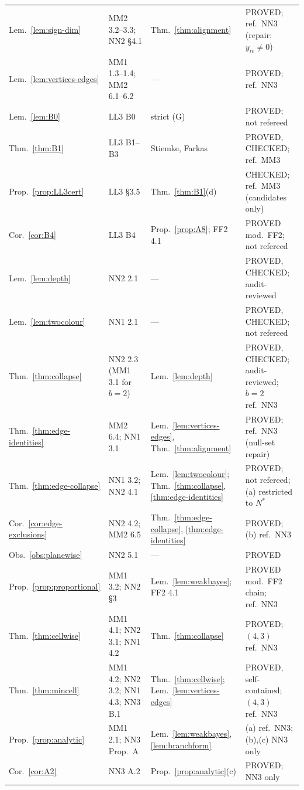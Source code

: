 \documentclass[11pt]{article}
\theoremstyle{definition}
\theoremstyle{remark}
\begin{document}
{\begin{longtable}{>{\raggedright}p{}>{\raggedright}p{}>{\raggedright}p{}>{\raggedright\arraybackslash}p{}}
Lem.~\ref{lem:sign-dim} & MM2 3.2--3.3; NN2 \S4.1 & Thm.~\ref{thm:alignment} & PROVED; ref.\ NN3 (repair: $y_{iv}\ne0$) \\
Lem.~\ref{lem:vertices-edges} & MM1 1.3--1.4; MM2 6.1--6.2 & --- & PROVED; ref.\ NN3 \\
Lem.~\ref{lem:B0} & LL3 B0 & strict (G) & PROVED; not refereed \\
Thm.~\ref{thm:B1} & LL3 B1--B3 & Stiemke, Farkas & PROVED, CHECKED; ref.\ MM3 \\
Prop.~\ref{prop:LL3cert} & LL3 \S3.5 & Thm.~\ref{thm:B1}(d) & CHECKED; ref.\ MM3 (candidates only) \\
Cor.~\ref{cor:B4} & LL3 B4 & Prop.~\ref{prop:A8}; FF2 4.1 & PROVED mod.\ FF2; not refereed \\
Lem.~\ref{lem:depth} & NN2 2.1 & --- & PROVED, CHECKED; audit-reviewed \\
Lem.~\ref{lem:twocolour} & NN1 2.1 & --- & PROVED, CHECKED; not refereed \\
Thm.~\ref{thm:collapse} & NN2 2.3 (MM1 3.1 for $b=2$) & Lem.~\ref{lem:depth} & PROVED, CHECKED; audit-reviewed; $b=2$ ref.\ NN3 \\
Thm.~\ref{thm:edge-identities} & MM2 6.4; NN1 3.1 & Lem.~\ref{lem:vertices-edges}, Thm.~\ref{thm:alignment} & PROVED; ref.\ NN3 (null-set repair) \\
Thm.~\ref{thm:edge-collapse} & NN1 3.2; NN2 4.1 & Lem.~\ref{lem:twocolour}; Thm.~\ref{thm:collapse}, \ref{thm:edge-identities} & PROVED; not refereed; (a) restricted to $N^*$ \\
Cor.~\ref{cor:edge-exclusions} & NN2 4.2; MM2 6.5 & Thm.~\ref{thm:edge-collapse}, \ref{thm:edge-identities} & PROVED; (b) ref.\ NN3 \\
Obs.~\ref{obs:planewise} & NN2 5.1 & --- & PROVED \\
Prop.~\ref{prop:proportional} & MM1 3.2; NN2 \S3 & Lem.~\ref{lem:weakbayes}; FF2 4.1 & PROVED mod.\ FF2 chain; ref.\ NN3 \\
Thm.~\ref{thm:cellwise} & MM1 4.1; NN2 3.1; NN1 4.2 & Thm.~\ref{thm:collapse} & PROVED; $(4,3)$ ref.\ NN3 \\
Thm.~\ref{thm:mincell} & MM1 4.2; NN2 3.2; NN1 4.3; NN3 B.1 & Thm.~\ref{thm:cellwise}; Lem.~\ref{lem:vertices-edges} & PROVED, self-contained; $(4,3)$ ref.\ NN3 \\
Prop.~\ref{prop:analytic} & MM1 2.1; NN3 Prop.~A & Lem.~\ref{lem:weakbayes}, \ref{lem:branchform} & (a) ref.\ NN3; (b),(c) NN3 only \\
Cor.~\ref{cor:A2} & NN3 A.2 & Prop.~\ref{prop:analytic}(c) & PROVED; NN3 only \\

\end{longtable}}
\end{document}
